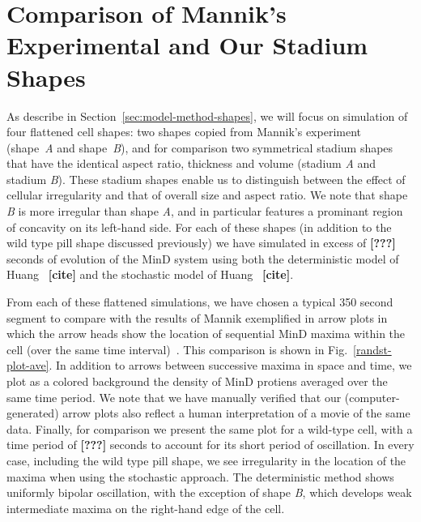 \documentclass[letterpaper,twocolumn,amsmath,amssymb,pre]{revtex4-1}
\newcommand{\red}[1]{{\bf \color{red} #1}}
\newcommand{\fixme}[1]{\red{[#1]}}
\begin{document}
\section{Comparison of Mannik's Experimental and Our Stadium Shapes}

As describe in Section~\ref{sec:model-method-shapes}, we will focus on
simulation of four flattened cell shapes: two shapes copied from
Mannik's experiment~\cite{mannik2012robustness} (shape~\emph{A} and
shape~\emph{B}), and for comparison two symmetrical stadium shapes
that have the identical aspect ratio, thickness and volume (stadium
\emph{A} and stadium \emph{B}).  These stadium shapes enable us to
distinguish between the effect of cellular irregularity and that of
overall size and aspect ratio.  We note that shape \emph{B} is more
irregular than shape \emph{A}, and in particular features a prominant
region of concavity on its left-hand side.  For each of these shapes
(in addition to the wild type pill shape discussed previously) we have
simulated in excess of \fixme{???} seconds of evolution of the MinD
system using both the deterministic model of Huang~\fixme{cite} and
the stochastic model of Huang~\fixme{cite}.

From each of these flattened simulations, we have chosen a typical 350
second segment to compare with the results of Mannik exemplified in
arrow plots in which the arrow heads show the location of sequential
MinD maxima within the cell (over the same time
interval)~\cite{mannik2012robustness}.  This comparison is shown in
Fig.~\ref{randst-plot-ave}.  In addition to arrows between successive
maxima in space and time, we plot as a colored background the density
of MinD protiens averaged over the same time period.  We note that we
have manually verified that our (computer-generated) arrow plots also
reflect a human interpretation of a movie of the same data.  Finally,
for comparison we present the same plot for a wild-type cell, with a
time period of \fixme{???}  seconds to account for its short period of
oscillation.  In every case, including the wild type pill shape, we
see irregularity in the location of the maxima when using the
stochastic approach.  The deterministic method shows uniformly bipolar
oscillation, with the exception of shape \emph{B}, which develops weak
intermediate maxima on the right-hand edge of the cell.

\end{document}
